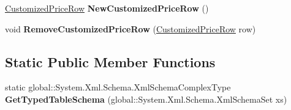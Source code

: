 \begin{DoxyCompactItemize}
\item 
\hyperlink{class_products_1_1_data_1_1ds_sage_1_1_customized_price_row}{Customized\+Price\+Row} {\bfseries New\+Customized\+Price\+Row} ()\hypertarget{class_products_1_1_data_1_1ds_sage_1_1_customized_price_data_table_affbd9337cd251bdc25eab4866d2f9d2d}{}\label{class_products_1_1_data_1_1ds_sage_1_1_customized_price_data_table_affbd9337cd251bdc25eab4866d2f9d2d}

\item 
void {\bfseries Remove\+Customized\+Price\+Row} (\hyperlink{class_products_1_1_data_1_1ds_sage_1_1_customized_price_row}{Customized\+Price\+Row} row)\hypertarget{class_products_1_1_data_1_1ds_sage_1_1_customized_price_data_table_adb38dc019eb056853f928ffc523173de}{}\label{class_products_1_1_data_1_1ds_sage_1_1_customized_price_data_table_adb38dc019eb056853f928ffc523173de}

\end{DoxyCompactItemize}
\subsection*{Static Public Member Functions}
\begin{DoxyCompactItemize}
\item 
static global\+::\+System.\+Xml.\+Schema.\+Xml\+Schema\+Complex\+Type {\bfseries Get\+Typed\+Table\+Schema} (global\+::\+System.\+Xml.\+Schema.\+Xml\+Schema\+Set xs)\hypertarget{class_products_1_1_data_1_1ds_sage_1_1_customized_price_data_table_a6f3010e32e24e98fa7c88d40da3dd079}{}\label{class_products_1_1_data_1_1ds_sage_1_1_customized_price_data_table_a6f3010e32e24e98fa7c88d40da3dd079}

\end{DoxyCompactItemize}
